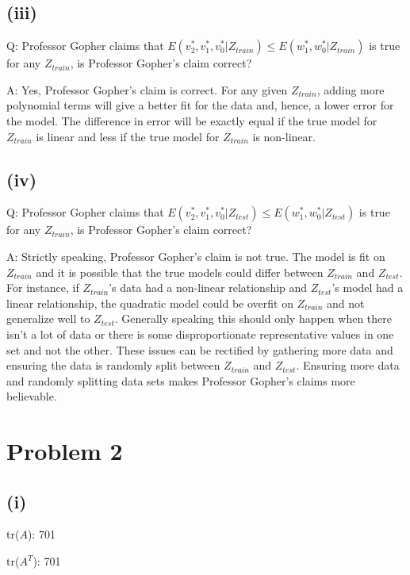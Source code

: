\documentclass{article}
\begin{document}
\subsection{(iii)}

Q: Professor Gopher claims that $E(v_{2}^*, v_{1}^*, v_{0}^* | Z_{train}) \leq E(w_{1}^*, w_{0}^* | Z_{train})$ is true for any $Z_{train}$, is Professor Gopher's claim correct?

\noindent A: Yes, Professor Gopher's claim is correct.  For any given $Z_{train}$, adding more polynomial terms will give a better fit for the data and, hence, a lower error for the model.  The difference in error will be exactly equal if the true model for $Z_{train}$ is linear and less if the true model for $Z_{train}$ is non-linear.

\subsection{(iv)}

Q: Professor Gopher claims that $E(v_{2}^*, v_{1}^*, v_{0}^* | Z_{test}) \leq E(w_{1}^*, w_{0}^* | Z_{test})$ is true for any $Z_{train}$, is Professor Gopher's claim correct?

\noindent A: Strictly speaking, Professor Gopher's claim is not true.  The model is fit on $Z_{train}$ and it is possible that the true models could differ between $Z_{train}$ and $Z_{test}$.  For instance, if $Z_{train}$'s data had a non-linear relationship and $Z_{test}$'s model had a linear relationship, the quadratic model could be overfit on $Z_{train}$ and not generalize well to $Z_{test}$.  Generally speaking this should only happen when there isn't a lot of data or there is some disproportionate representative values in one set and not the other.  These issues can be rectified by gathering more data and ensuring the data is randomly split between $Z_{train}$ and $Z_{test}$.  Ensuring more data and randomly splitting data sets makes Professor Gopher's claims more believable.

\section{Problem 2}
\subsection{(i)}

tr($A$): 701

\noindent tr($A^T$): 701
\end{document}
